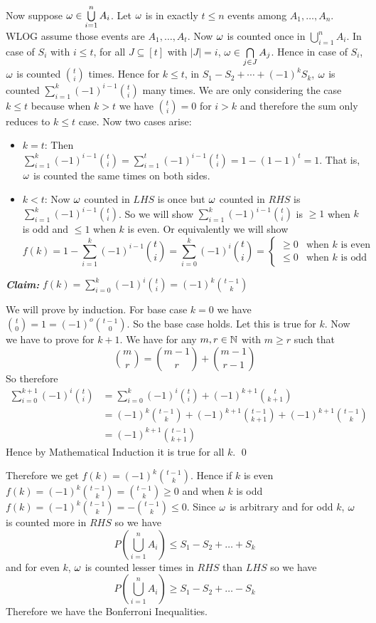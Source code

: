 \documentclass[a4paper, 11pt]{article}
\renewenvironment{proof}{\noindent{\it \textbf{Proof:}}\hspace*{1em}}{\qed\bigskip\\}
\begin{document}
{\begin{enumerate}[label=(\alph*)]
Now suppose $\omega \in \bigcup\limits_{i=1}^nA_i$. Let $\omega$ is in exactly $t\leq n$ events among $A_1,\dots, A_n$. WLOG assume those events are $A_1,\dots, A_t$. Now $\omega $ is counted once in $\bigcup\limits_{i=1}^nA_i$. In case of $S_i$ with $i\leq t$, for all $J\subseteq [t]$ with $|J|=i$, $\omega \in \bigcap\limits_{j\in J}A_j$. Hence in case of $S_i$, $\omega $ is counted $\binom{t}{i}$ times. Hence for $k\leq t$, in $S_1-S_2+\cdots+(-1)^kS_k$, $\omega $ is counted $\sum\limits_{i=1}^k (-1)^{i-1}\binom{t}{i}$ many times. We are only considering the case $k\leq t$ because when $k>t$ we have $\binom{t}{i}=0$ for $i>k$ and therefore the sum only reduces to $k\leq t$ case. Now two cases arise:\begin{itemize}
	\item $k=t$: Then $\sum\limits_{i=1}^k (-1)^{i-1}\binom{t}{i}=\sum\limits_{i=1}^t (-1)^{i-1}\binom{t}{i}=1-(1-1)^t=1$. That is, $\omega$ is counted the same times on both sides.
	\item $k<t$: Now $\omega$ counted in $LHS$ is once but $\omega$ counted in $RHS$ is $\sum\limits_{i=1}^k (-1)^{i-1}\binom{t}{i}$. So we will show $\sum\limits_{i=1}^k (-1)^{i-1}\binom{t}{i}$ is $\geq 1$ when $k$ is odd and $\leq 1$ when $k$ is even. Or equivalently we will show $$f(k)=1-\sum\limits_{i=1}^k (-1)^{i-1}\binom{t}{i}=\sum\limits_{i=0}^k (-1)^{i}\binom{t}{i}=\begin{cases}
		\geq 0& \text{when $k$ is even}\\
		\leq 0 & \text{when $k$ is odd}
	\end{cases}$$
\end{itemize}\parinf

\textbf{\textit{Claim:}} $f(k)=\sum\limits_{i=0}^k (-1)^{i}\binom{t}{i}=(-1)^k\binom{t-1}{k}$

\begin{proof}
	We will prove by induction. For base case $k=0$ we have $\binom{t}{0}=1=(-1)^o\binom{t-1}{0}$. So the base case holds. Let this is true for $k$. Now we have to prove for $k+1$. We have for any $m,r\in\mathbb{N}$ with $m\geq r$ such that $$\binom{m}{r}=\binom{m-1}{r}+\binom{m-1}{r-1}$$So therefore\begin{align*}
		\sum\limits_{i=0}^{k+1} (-1)^{i}\binom{t}{i} & = 	\sum\limits_{i=0}^{k} (-1)^{i}\binom{t}{i}+(-1)^{k+1}\binom{t}{k+1}\\
		& = (-1)^k\binom{t-1}{k}+(-1)^{k+1}\binom{t-1}{k+1}+(-1)^{k+1}\binom{t-1}{k}\\
		& = (-1)^{k+1}\binom{t-1}{k+1}
	\end{align*}Hence by Mathematical Induction it is true for all $k$.
\end{proof}\parinn

Therefore we get $f(k)=(-1)^k\binom{t-1}{k}$. Hence if $k$ is even $f(k)=(-1)^k\binom{t-1}{k}=\binom{t-1}{k}\geq 0$ and when $k$ is odd $f(k)=(-1)^k\binom{t-1}{k}=-\binom{t-1}{k}\leq 0$. Since $\omega$ is arbitrary and for odd $k$, $\omega$ is counted more in $RHS$ so we have $$	P\left(\bigcup_{i=1}^n A_i\right) \leq S_1-S_2+\ldots+S_k$$ and for even $k$, $\omega$ is counted lesser times in $RHS$ than $LHS$ so we have $$	P\left(\bigcup_{i=1}^n A_i\right) \geq S_1-S_2+\ldots-S_k$$Therefore we have the Bonferroni Inequalities.
		\end{enumerate}
}
\end{document}
